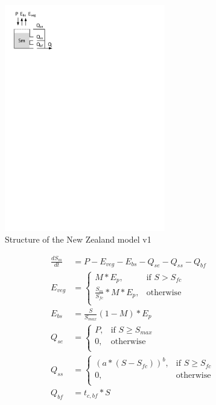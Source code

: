 { 																	%
\begin{figure}
\includegraphics[trim=1cm 24cm 10cm 1cm,width=7cm,keepaspectratio]{./files/04_schematic.pdf}
\caption{Structure of the New Zealand model v1} \label{fig:04_schematic}
\end{figure}

\begin{align}
	\frac{dS_m}{dt} &= P - E_{veg} - E_{bs}  - Q_{se} - Q_{ss} - Q_{bf}\\
	E_{veg} &= \begin{cases}
		M*E_p, &\text{if } S > S_{fc} \\
		\frac{S_m}{S_{fc}}*M*E_p, &\text{otherwise} \\
	\end{cases} \\
	E_{bs} &= \frac{S}{S_{max}}(1-M)*E_p \\
	Q_{se} &= \begin{cases}
		P, &\text{if } S \geq S_{max}\\
		0, &\text{otherwise}\\
	\end{cases}\\
	Q_{ss} &= \begin{cases}
		\left(a*(S-S_{fc})\right)^b, &\text{if } S \geq S_{fc} \\
		0, &\text{otherwise}\\
		\end{cases}\\
	Q_{bf} &= t_{c,bf}*S	
\end{align}

} %

